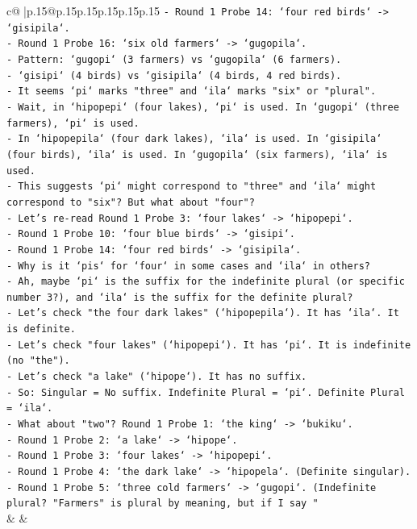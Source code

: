 \documentclass{article}
\begin{document}
{\begin{supertabular}{c@{$\;$}|p{.15\linewidth}@{}p{.15\linewidth}p{.15\linewidth}p{.15\linewidth}p{.15\linewidth}p{.15\linewidth}}
{{{\texttt{{-} Round 1 Probe 14: `four red birds` {-}> `gisipila`.} \\
\texttt{{-} Round 1 Probe 16: `six old farmers` {-}> `gugopila`.} \\
\texttt{{-} Pattern: `gugopi` (3 farmers) vs `gugopila` (6 farmers).} \\
\texttt{{-} `gisipi` (4 birds) vs `gisipila` (4 birds, 4 red birds).} \\
\texttt{{-} It seems `pi` marks "three" and `ila` marks "six" or "plural".} \\
\texttt{{-} Wait, in `hipopepi` (four lakes), `pi` is used. In `gugopi` (three farmers), `pi` is used.} \\
\texttt{{-} In `hipopepila` (four dark lakes), `ila` is used. In `gisipila` (four birds), `ila` is used. In `gugopila` (six farmers), `ila` is used.} \\
\texttt{{-} This suggests `pi` might correspond to "three" and `ila` might correspond to "six"? But what about "four"?} \\
\texttt{{-} Let's re{-}read Round 1 Probe 3: `four lakes` {-}> `hipopepi`.} \\
\texttt{{-} Round 1 Probe 10: `four blue birds` {-}> `gisipi`.} \\
\texttt{{-} Round 1 Probe 14: `four red birds` {-}> `gisipila`.} \\
\texttt{{-} Why is it `pis` for `four` in some cases and `ila` in others?} \\
\texttt{{-} Ah, maybe `pi` is the suffix for the indefinite plural (or specific number 3?), and `ila` is the suffix for the definite plural?} \\
\texttt{{-} Let's check "the four dark lakes" (`hipopepila`). It has `ila`. It is definite.} \\
\texttt{{-} Let's check "four lakes" (`hipopepi`). It has `pi`. It is indefinite (no "the").} \\
\texttt{{-} Let's check "a lake" (`hipope`). It has no suffix.} \\
\texttt{{-} So: Singular = No suffix. Indefinite Plural = `pi`. Definite Plural = `ila`.} \\
\texttt{{-} What about "two"? Round 1 Probe 1: `the king` {-}> `bukiku`.} \\
\texttt{{-} Round 1 Probe 2: `a lake` {-}> `hipope`.} \\
\texttt{{-} Round 1 Probe 3: `four lakes` {-}> `hipopepi`.} \\
\texttt{{-} Round 1 Probe 4: `the dark lake` {-}> `hipopela`. (Definite singular).} \\
\texttt{{-} Round 1 Probe 5: `three cold farmers` {-}> `gugopi`. (Indefinite plural? "Farmers" is plural by meaning, but if I say "} \\
            }
        }
    }
    & & \\ \\


\end{supertabular}}
\end{document}

